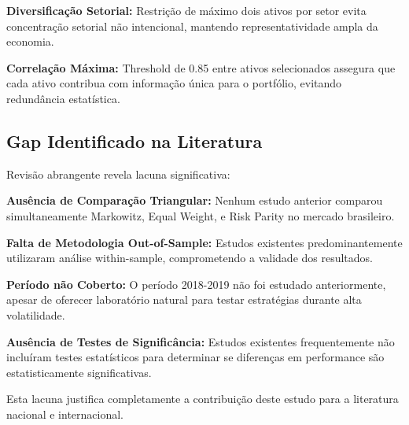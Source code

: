 \textbf{Diversificação Setorial:} Restrição de máximo dois ativos por setor evita concentração setorial não intencional, mantendo representatividade ampla da economia.

\textbf{Correlação Máxima:} Threshold de 0.85 entre ativos selecionados assegura que cada ativo contribua com informação única para o portfólio, evitando redundância estatística.

\subsection{Gap Identificado na Literatura}

Revisão abrangente revela lacuna significativa:

\textbf{Ausência de Comparação Triangular:} Nenhum estudo anterior comparou simultaneamente Markowitz, Equal Weight, e Risk Parity no mercado brasileiro.

\textbf{Falta de Metodologia Out-of-Sample:} Estudos existentes predominantemente utilizaram análise within-sample, comprometendo a validade dos resultados.

\textbf{Período não Coberto:} O período 2018-2019 não foi estudado anteriormente, apesar de oferecer laboratório natural para testar estratégias durante alta volatilidade.

\textbf{Ausência de Testes de Significância:} Estudos existentes frequentemente não incluíram testes estatísticos para determinar se diferenças em performance são estatisticamente significativas.

Esta lacuna justifica completamente a contribuição deste estudo para a literatura nacional e internacional.